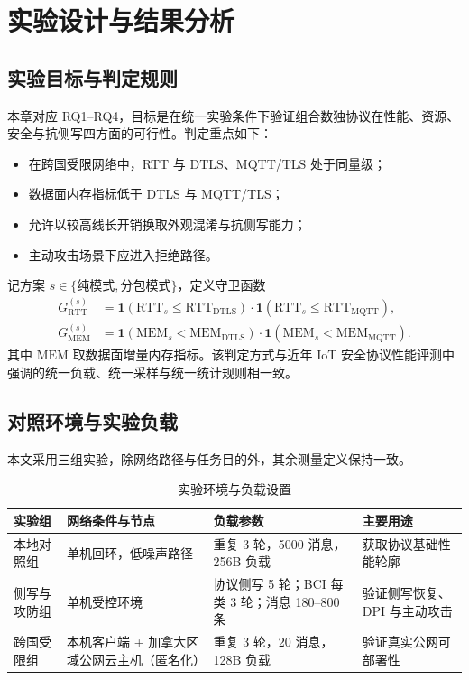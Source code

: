 \chapter{实验设计与结果分析}

\section{实验目标与判定规则}
本章对应 RQ1--RQ4，目标是在统一实验条件下验证组合数独协议在性能、资源、安全与抗侧写四方面的可行性。判定重点如下：
\begin{itemize}
  \item 在跨国受限网络中，RTT 与 DTLS、MQTT/TLS 处于同量级；
  \item 数据面内存指标低于 DTLS 与 MQTT/TLS；
  \item 允许以较高线长开销换取外观混淆与抗侧写能力；
  \item 主动攻击场景下应进入拒绝路径。
\end{itemize}

记方案 $s\in\{\text{纯模式},\text{分包模式}\}$，定义守卫函数
\[
\begin{aligned}
G_{\mathrm{RTT}}^{(s)} &= \mathbf{1}\!\left(\mathrm{RTT}_s \le \mathrm{RTT}_{\mathrm{DTLS}}\right)\cdot
\mathbf{1}\!\left(\mathrm{RTT}_s \le \mathrm{RTT}_{\mathrm{MQTT}}\right),\\
G_{\mathrm{MEM}}^{(s)} &= \mathbf{1}\!\left(\mathrm{MEM}_s < \mathrm{MEM}_{\mathrm{DTLS}}\right)\cdot
\mathbf{1}\!\left(\mathrm{MEM}_s < \mathrm{MEM}_{\mathrm{MQTT}}\right).
\end{aligned}
\]
其中 $\mathrm{MEM}$ 取数据面增量内存指标。该判定方式与近年 IoT 安全协议性能评测中强调的统一负载、统一采样与统一统计规则相一致\cite{restuccia2020lowpower,nedergaard2023coapsecure,gavriilidis2025mqtttls}。

\section{对照环境与实验负载}
本文采用三组实验，除网络路径与任务目的外，其余测量定义保持一致。

\begin{table}[H]
\centering
\scriptsize
\caption{实验环境与负载设置}
\label{tab:c4-env}
\begin{tabular}{p{2.2cm}p{4.3cm}p{3.5cm}p{3.3cm}}
\toprule
实验组 & 网络条件与节点 & 负载参数 & 主要用途 \\
\midrule
本地对照组 & 单机回环，低噪声路径 & 重复 3 轮，5000 消息，256B 负载 & 获取协议基础性能轮廓 \\
\midrule
侧写与攻防组 & 单机受控环境 & 协议侧写 5 轮；BCI 每类 3 轮；消息 180--800 条 & 验证侧写恢复、DPI 与主动攻击 \\
\midrule
跨国受限组 & 本机客户端 + 加拿大区域公网云主机（匿名化） & 重复 3 轮，20 消息，128B 负载 & 验证真实公网可部署性 \\
\bottomrule
\end{tabular}
\end{table}

